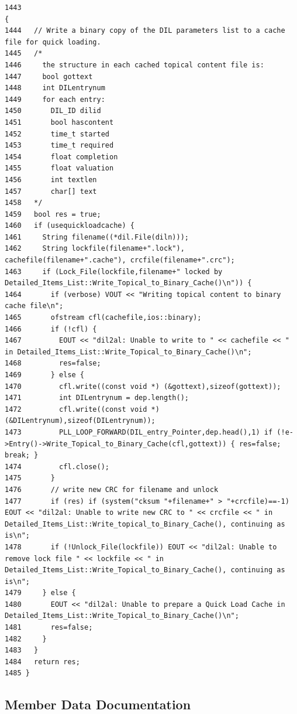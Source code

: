 \footnotesize\begin{verbatim}1443                                                                                                                 {
1444   // Write a binary copy of the DIL parameters list to a cache file for quick loading.
1445   /*
1446     the structure in each cached topical content file is:
1447     bool gottext
1448     int DILentrynum
1449     for each entry:
1450       DIL_ID dilid
1451       bool hascontent
1452       time_t started
1453       time_t required
1454       float completion
1455       float valuation
1456       int textlen
1457       char[] text
1458   */
1459   bool res = true;
1460   if (usequickloadcache) {
1461     String filename((*dil.File(diln)));
1462     String lockfile(filename+".lock"), cachefile(filename+".cache"), crcfile(filename+".crc");
1463     if (Lock_File(lockfile,filename+" locked by Detailed_Items_List::Write_Topical_to_Binary_Cache()\n")) {
1464       if (verbose) VOUT << "Writing topical content to binary cache file\n";
1465       ofstream cfl(cachefile,ios::binary);
1466       if (!cfl) {
1467         EOUT << "dil2al: Unable to write to " << cachefile << " in Detailed_Items_List::Write_Topical_to_Binary_Cache()\n";
1468         res=false;
1469       } else {
1470         cfl.write((const void *) (&gottext),sizeof(gottext));
1471         int DILentrynum = dep.length();
1472         cfl.write((const void *) (&DILentrynum),sizeof(DILentrynum));
1473         PLL_LOOP_FORWARD(DIL_entry_Pointer,dep.head(),1) if (!e->Entry()->Write_Topical_to_Binary_Cache(cfl,gottext)) { res=false; break; }
1474         cfl.close();
1475       }
1476       // write new CRC for filename and unlock
1477       if (res) if (system("cksum "+filename+" > "+crcfile)==-1)  EOUT << "dil2al: Unable to write new CRC to " << crcfile << " in Detailed_Items_List::Write_topical_to_Binary_Cache(), continuing as is\n";
1478       if (!Unlock_File(lockfile)) EOUT << "dil2al: Unable to remove lock file " << lockfile << " in Detailed_Items_List::Write_Topical_to_Binary_Cache(), continuing as is\n";
1479     } else {
1480       EOUT << "dil2al: Unable to prepare a Quick Load Cache in Detailed_Items_List::Write_Topical_to_Binary_Cache()\n";
1481       res=false;
1482     }
1483   }
1484   return res;
1485 }
\end{verbatim}\normalsize 


\subsection{Member Data Documentation}
